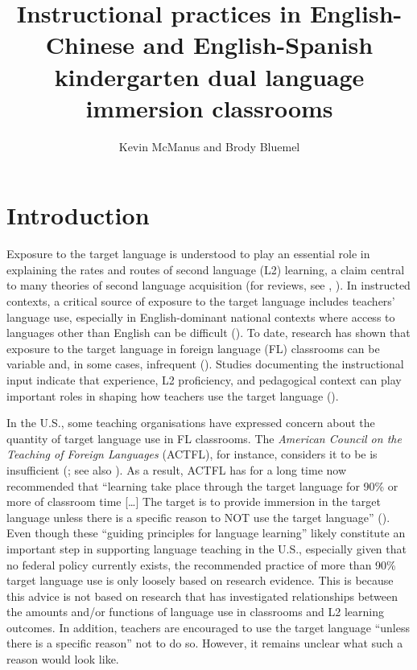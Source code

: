\documentclass[output=paper,chinesefont]{langscibook}
\author{Kevin McManus\orcid{}\affiliation{Penn State University} and Brody Bluemel\orcid{}\affiliation{Delaware State University}}
\title[Instructional practices in  dual language immersion classrooms]
      {Instructional practices in English-Chinese and English-Spanish kindergarten dual language immersion classrooms}
\begin{document}
\maketitle 

\section{Introduction}

Exposure to the target language is understood to play an essential role in explaining the rates and routes of second language (L2) learning, a claim central to many theories of second language acquisition (for reviews, see \citealt{GassEtAl2021}, \citeauthor{MitchellEtAl2019} \citeyear{MitchellEtAl2019}). In instructed contexts, a critical source of exposure to the target language includes teachers’ language use, especially in English-dominant national contexts where access to languages other than English can be difficult (\citealt{LanversEtAl2021,MitchellMyles2019,PorterEtAl2020}). To date, research has shown that exposure to the target language in foreign language (FL) classrooms can be variable and, in some cases, infrequent (\citealt{DuffPolio1990,Wilkerson2008}). Studies documenting the instructional input indicate that experience, L2 proficiency, and pedagogical context can play important roles in shaping how teachers use the target language (\citealt{CollinsEtAl2012,Huensch2019,Macaro2001}).

In the U.S., some teaching organisations have expressed concern about the quantity of target language use in FL classrooms. The \textit{American Council on the Teaching of Foreign Languages} (ACTFL), for instance, considers it to be is insufficient (\citealt{ACTFL2021}; see also \citealt{VanPatten2014}). As a result, ACTFL has for a long time now recommended that ``learning take place through the target language for 90\% or more of classroom time […] The target is to provide immersion in the target language unless there is a specific reason to NOT use the target language'' (\citealt{ACTFL2021}). Even though these ``guiding principles for language learning'' likely constitute an important step in supporting language teaching in the U.S., especially given that no federal policy currently exists, the recommended practice of more than 90\% target language use is only loosely based on research evidence. This is because this advice is not based on research that has investigated relationships between the amounts and/or functions of language use in classrooms and L2 learning outcomes. In addition, teachers are encouraged to use the target language ``unless there is a specific reason'' not to do so. However, it remains unclear what such a reason would look like.
\end{document}
